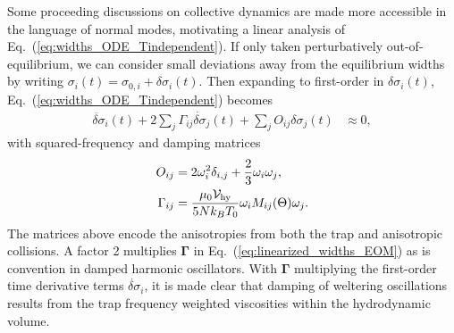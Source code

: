 \documentclass[reprint, amsmath, amssymb, aps, superscriptaddress]{revtex4-1}
\begin{document}
Some proceeding discussions on collective dynamics are made more accessible in the language of normal modes, motivating a linear analysis of Eq.~(\ref{eq:widths_ODE_Tindependent}). 
If only taken perturbatively out-of-equilibrium, we can consider small deviations away from the equilibrium widths by writing $\sigma_i(t) = \sigma_{0,i} + \delta\sigma_i(t)$. Then expanding to first-order in $\delta\sigma_i(t)$, Eq.~(\ref{eq:widths_ODE_Tindependent}) becomes
\begin{align} \label{eq:linearized_widths_EOM}
    \ddot{\delta\sigma}_i(t)
    +
    2 \sum_j 
    \Gamma_{i j}
    \dot{\delta\sigma}_{j}(t)
    +
    \sum_j
    O_{i j}
    \delta\sigma_j(t)
    &\approx
    0,
\end{align}
with squared-frequency and damping matrices 
\begin{subequations}
\begin{align}
    O_{i j}
    &=
    2 \omega_i^2 \delta_{i,j} 
    +
    \frac{ 2 }{ 3 } 
    \omega_i \omega_j, \\
    \Gamma_{ i j }
    &= 
    \frac{ \mu_0 {\cal V}_{\rm hy} }{ 5 N k_B T_0 }
    \omega_i
    M_{i j}(\Theta)
    \omega_{j}. 
\end{align}
\end{subequations} 
The matrices above encode the anisotropies from both the trap and anisotropic collisions. 
A factor 2 multiplies $\boldsymbol{\Gamma}$ in Eq.~(\ref{eq:linearized_widths_EOM}) as is convention in damped harmonic oscillators. 
With $\boldsymbol{\Gamma}$ multiplying the first-order time derivative terms $\dot{\delta\sigma}_i$, it is made clear that damping of weltering oscillations results from the trap frequency weighted viscosities within the hydrodynamic volume.   
\end{document}
